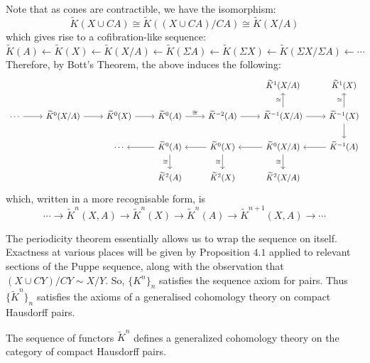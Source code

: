 \documentclass[11pt,a4paper]{article}
\begin{document}
Note that as cones are contractible, we have the isomorphism:
$$\widetilde{K}(X\cup CA) \cong \widetilde{K}((X\cup CA)/CA) \cong \widetilde{K}(X/A)$$
which gives rise to a cofibration-like sequence:
$$\widetilde{K}(A) \xleftarrow{} \widetilde{K}(X) \xleftarrow{} \widetilde{K}(X/A) \xleftarrow{} \widetilde{K}(\Sigma A) \xleftarrow{} \widetilde{K}(\Sigma X) \xleftarrow{} \widetilde{K}(\Sigma X/\Sigma A) \xleftarrow{} \cdots$$
Therefore, by Bott's Theorem, the above induces the following:
\[\begin{tikzcd}
	&&&&& {\widetilde{K}^{1}(X/A)} & {\widetilde{K}^{1}(X)} \\
	\cdots & {\widetilde{K}^0(X/A)} & {\widetilde{K}^0(X)} & {\widetilde{K}^{0}(A)} & {\widetilde{K}^{-2}(A)} & {\widetilde{K}^{-1}(X/A)} & {\widetilde{K}^{-1}(X)} \\
	&& \cdots & {\widetilde{K}^{0}(A)} & {\widetilde{K}^{0}(X)} & {\widetilde{K}^{0}(X/A)} & {\widetilde{K}^{-1}(A)} \\
	&&& {\widetilde{K}^{2}(A)} & {\widetilde{K}^{2}(X)} & {\widetilde{K}^{2}(X/A)}
	\arrow[from=2-1, to=2-2]
	\arrow[from=2-2, to=2-3]
	\arrow[from=2-3, to=2-4]
	\arrow["\cong", from=2-4, to=2-5]
	\arrow[from=2-5, to=2-6]
	\arrow[from=2-6, to=2-7]
	\arrow[from=2-7, to=3-7]
	\arrow[from=3-7, to=3-6]
	\arrow[from=3-6, to=3-5]
	\arrow[from=3-5, to=3-4]
	\arrow["\cong"', from=3-4, to=4-4]
	\arrow["\cong"', from=3-5, to=4-5]
	\arrow["\cong", from=2-7, to=1-7]
	\arrow["\cong", from=2-6, to=1-6]
	\arrow["\cong"', from=3-6, to=4-6]
	\arrow[from=3-4, to=3-3]
\end{tikzcd}\]
which, written in a more recognisable form, is
$$\cdots \rightarrow \widetilde{K}^n(X, A)\rightarrow \widetilde{K}^n(X) \rightarrow \widetilde{K}^n(A) \rightarrow \widetilde{K}^{n+1}(X, A)\rightarrow \cdots$$

The periodicity theorem essentially allows us to  wrap the sequence on itself. Exactness at various places will be given by Proposition $4.1$ applied to relevant sections of the Puppe sequence, along with the observation that $(X\cup CY)/CY \sim X/Y$. So, $\{K^n\}_{n}$ satisfies the sequence axiom for pairs. Thus $\{\widetilde K^n\}_n$ satisfies the axioms of a generalised cohomology theory on compact Hausdorff pairs.
\begin{theorem}
    The sequence of functors $\widetilde{K}^n$ defines a generalized cohomology theory on the category of compact Hausdorff pairs.
\end{theorem}
\end{document}
